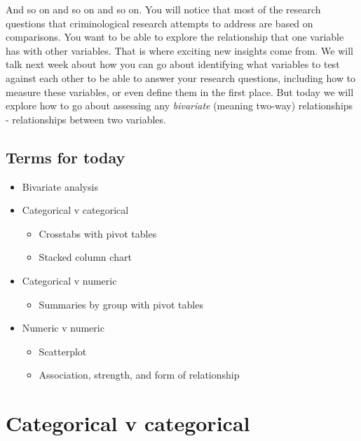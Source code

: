 \documentclass[
]{book}
\providecommand{\tightlist}{%
  \setlength{\itemsep}{0pt}\setlength{\parskip}{0pt}}
\begin{document}
And so on and so on and so on. You will notice that most of the research questions that criminological research attempts to address are based on comparisons. You want to be able to explore the relationship that one variable has with other variables. That is where exciting new insights come from. We will talk next week about how you can go about identifying what variables to test against each other to be able to answer your research questions, including how to measure these variables, or even define them in the first place. But today we will explore how to go about assessing any \emph{bivariate} (meaning two-way) relationships - relationships between two variables.

\hypertarget{terms-for-today-1}{%
\subsection{Terms for today}\label{terms-for-today-1}}

\begin{itemize}
\tightlist
\item
  Bivariate analysis
\item
  Categorical v categorical

  \begin{itemize}
  \tightlist
  \item
    Crosstabs with pivot tables
  \item
    Stacked column chart
  \end{itemize}
\item
  Categorical v numeric

  \begin{itemize}
  \tightlist
  \item
    Summaries by group with pivot tables
  \end{itemize}
\item
  Numeric v numeric

  \begin{itemize}
  \tightlist
  \item
    Scatterplot
  \item
    Association, strength, and form of relationship
  \end{itemize}
\end{itemize}

\hypertarget{categorical-v-categorical}{%
\section{Categorical v categorical}\label{categorical-v-categorical}}
\end{document}
